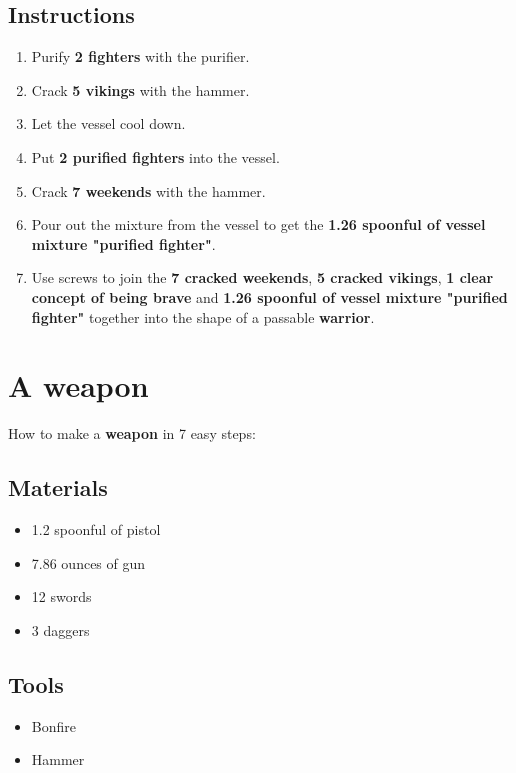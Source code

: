 \documentclass{article}
\begin{document}
\subsection{Instructions}\begin{enumerate}
\item 
Purify \textbf{2 fighters} with the purifier.
\item 
Crack \textbf{5 vikings} with the hammer.
\item 
Let the vessel cool down.
\item 
Put \textbf{2 purified fighters} into the vessel.
\item 
Crack \textbf{7 weekends} with the hammer.
\item 
Pour out the mixture from the vessel to get the \textbf{1.26 spoonful of vessel mixture "purified fighter"}.
\item 
Use screws to join the \textbf{7 cracked weekends}, \textbf{5 cracked vikings}, \textbf{1 clear concept of being brave} and \textbf{1.26 spoonful of vessel mixture "purified fighter"} together into the shape of a passable \textbf{warrior}.
\end{enumerate}
\newpage
\section{A weapon}How to make a \textbf{weapon} in 7 easy steps:

\subsection{Materials}\begin{itemize}
\item 
1.2 spoonful of pistol
\item 
7.86 ounces of gun
\item 
12 swords
\item 
3 daggers
\end{itemize}
\subsection{Tools}\begin{itemize}
\item 
Bonfire
\item 
Hammer
\end{itemize}
\end{document}
